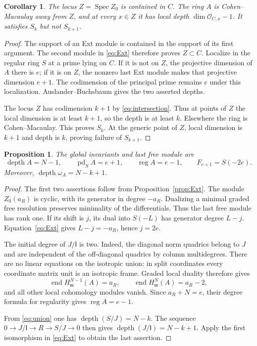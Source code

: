 \documentclass[11pt]{article}
\newtheorem{proposition}[theorem]{Proposition}
\newtheorem{corollary}[theorem]{Corollary}
\theoremstyle{definition}
\theoremstyle{remark}
\numberwithin{equation}{section}
\DeclareMathOperator{\Spec}{Spec}
\DeclareMathOperator{\depth}{depth}
\DeclareMathOperator{\pd}{pd}
\DeclareMathOperator{\reg}{reg}
\newcommand{\OO}{\mathcal O}
\newcommand{\II}{\mathsf I}
\begin{document}
\begin{corollary}\label{cor:local-depth}
The locus $Z=\Spec Z_0$ is contained in $C$. The ring $A$ is
Cohen--Macaulay away from $Z$, and at every $x\in Z$ it has local
depth $\dim\OO_{C,x}-1$. It satisfies $S_k$ but not $S_{k+1}$.
\end{corollary}

\begin{proof}
The support of an Ext module is contained in the support of its first
argument. The second module in \eqref{eq:Ext} therefore proves
$Z\subset C$. Localize in the regular ring $S$ at a prime lying
on $C$. If it is not on $Z$, the projective dimension of $A$ there
is $e$; if it is on $Z$, the nonzero last Ext module makes that
projective dimension $e+1$. The codimension of the principal prime
remains $e$ under this localization. Auslander--Buchsbaum gives the
two asserted depths.

The locus $Z$ has codimension $k+1$ by \eqref{eq:intersection}. Thus
at points of $Z$ the local dimension is at least $k+1$, so the depth
is at least $k$. Elsewhere the ring is Cohen--Macaulay. This proves
$S_k$. At the generic point of $Z$, local dimension is $k+1$ and
depth is $k$, proving failure of $S_{k+1}$.
\end{proof}

\begin{proposition}\label{prop:graded-endpoints}
The global invariants and last free module are
\[
 \depth A=N-1,\qquad\pd_S A=e+1,\qquad\reg A=e-1,
 \qquad F_{e+1}=S(-2e).
\]
Moreover, $\depth\omega_A=N-k+1$.
\end{proposition}

\begin{proof}
The first two assertions follow from Proposition~\ref{prop:Ext}.
The module $Z_0(a_R)$ is cyclic, with its generator in degree $-a_R$.
Dualizing a minimal graded free resolution preserves minimality of
the differentials. Thus the last free module has rank one. If its
shift is $j$, its dual into $S(-L)$ has generator degree $L-j$.
Equation~\eqref{eq:Ext} gives $L-j=-a_R$, hence $j=2e$.

The initial degree of $J/\II$ is two. Indeed, the diagonal norm
quadrics belong to $J$ and are independent of the off-diagonal
quadrics by column multidegrees. There are no linear equations on
the isotropic union: in split coordinates every coordinate matrix
unit is an isotropic frame. Graded local duality therefore gives
\[
 \operatorname{end} H^{N-1}_{\mathfrak m}(A)=a_R,
 \qquad
 \operatorname{end} H^N_{\mathfrak m}(A)=a_R-2,
\]
and all other local cohomology modules vanish. Since $a_R+N=e$,
their degree formula for regularity gives $\reg A=e-1$.

From \eqref{eq:union} one has $\depth(S/J)=N-k$.
The sequence $0\to J/\II\to R\to S/J\to0$ then gives
$\depth(J/\II)=N-k+1$. Apply the first isomorphism in
\eqref{eq:Ext} to obtain the last assertion.
\end{proof}
\end{document}
